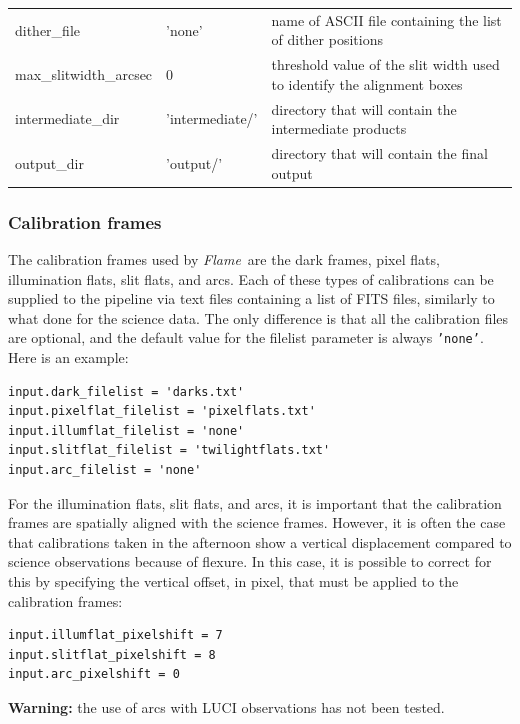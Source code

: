 \documentclass[a4paper]{article}
\newcommand{\flame}{\emph{Flame}}
\begin{document}
\begin{sloppypar}
\begin{table}
{\begin{tabular}{lll}
dither\_file       		& 'none' 				& name of ASCII file containing the list of dither positions \\
max\_slitwidth\_arcsec & 0          & threshold value of the slit width used to identify the alignment boxes \\
intermediate\_dir		 & 'intermediate/'		& directory that will contain the intermediate products \\
output\_dir				   & 'output/'			& directory that will contain the final output \\
\hline
\end{tabular}
}
\end{table}


\subsubsection{Calibration frames}
The calibration frames used by \flame\ are the dark frames, pixel flats, illumination flats, slit flats, and arcs. Each of these types of calibrations can be supplied to the pipeline via text files containing a list of FITS files, similarly to what done for the science data. The only difference is that all the calibration files are optional, and the default value for the filelist parameter is always \texttt{'none'}. Here is an example:
\begin{lstlisting}
input.dark_filelist = 'darks.txt'
input.pixelflat_filelist = 'pixelflats.txt'
input.illumflat_filelist = 'none'
input.slitflat_filelist = 'twilightflats.txt'
input.arc_filelist = 'none'
\end{lstlisting}
For the illumination flats, slit flats, and arcs, it is important that the calibration frames are spatially aligned with the science frames. However, it is often the case that calibrations taken in the afternoon show a vertical displacement compared to science observations because of flexure. In this case, it is possible to correct for this by specifying the vertical offset, in pixel, that must be applied to the calibration frames:
\begin{lstlisting}
input.illumflat_pixelshift = 7
input.slitflat_pixelshift = 8
input.arc_pixelshift = 0
\end{lstlisting}

\textbf{Warning:} the use of arcs with LUCI observations has not been tested.



\end{sloppypar}
\end{document}
